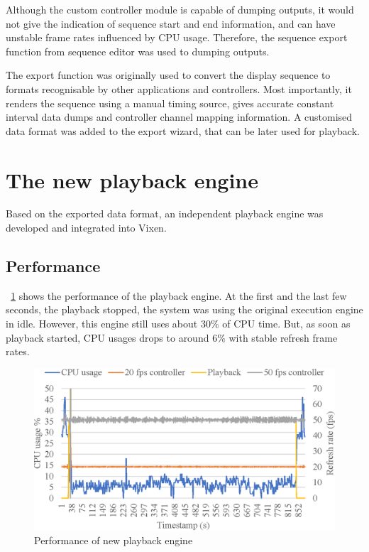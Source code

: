 \documentclass[journal]{IEEEtran}
\newcommand{\fref}[1]{\figurename~\ref{#1}}
\begin{document}
Although the custom controller module is capable of dumping outputs, it would not give the indication of sequence start and end information, and can have unstable frame rates influenced by CPU usage. Therefore, the sequence export function from sequence editor was used to dumping outputs.

The export function was originally used to convert the display sequence to formats recognisable by other applications and controllers. Most importantly, it renders the sequence using a manual timing source, gives accurate constant interval data dumps and controller channel mapping information. A customised data format was added to the export wizard, that can be later used for playback.

\section{The new playback engine}

Based on the exported data format, an independent playback engine was developed and integrated into Vixen.

\subsection{Performance}

\fref{fig:playback} shows the performance of the playback engine. At the first and the last few seconds, the playback stopped, the system was using the original execution engine in idle. However, this engine still uses about $30 \%$ of CPU time. But, as soon as playback started, CPU usages drops to around $6 \%$ with stable refresh frame rates.

\begin{figure}[t]
    \centering
    \includegraphics[width=0.8\columnwidth]{playback}
    \caption{Performance of new playback engine}
    \label{fig:playback}
\end{figure}
\end{document}
